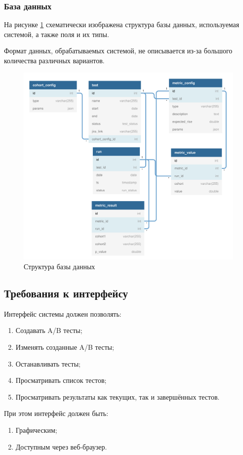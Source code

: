 \documentclass[../document.tex]{subfiles}
\begin{document}
	\subsubsection{База данных}
	\par На рисунке \ref{image:db_plot} схематически изображена структура базы данных, используемая системой, а также поля и их типы.
	\par Формат данных, обрабатываемых системой, не описывается из-за большого количества различных вариантов.
	\begin{figure}[h] 
		\includegraphics[width=\linewidth]{db_graph.pdf}
		\caption{\label{image:db_plot}Структура базы данных}
	\end{figure}
	\subsection{Требования к интерфейсу}
	\par Интерфейс системы должен позволять:
	\begin{enumerate}
		\item Создавать A/B тесты;
		\item Изменять созданные A/B тесты;
		\item Останавливать тесты;
		\item Просматривать список тестов;
		\item Просматривать результаты как текущих, так и завершённых тестов.
	\end{enumerate}
	\par При этом интерфейс должен быть:
	\begin{enumerate}
		\item Графическим;
		\item Доступным через веб-браузер.
	\end{enumerate}
\end{document}

